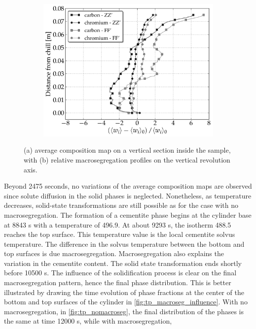 \begin{figure}[htbp]
\begin{subfigure}[t]{0.55\textwidth}
	\includegraphics[width=1.0\textwidth]{Chapter3/Graphics/multicomponent/interior/final_segregation_ZZ_FF.pdf}
	\caption{}
    \label{fig:final_segregation_ZZ_FF}
  \end{subfigure}
\caption{(a) average composition map on a vertical section inside the sample, with
 (b) relative macrosegregation profiles on the vertical revolution axis.} 
\label{fig:final_ZZ_FF}
\end{figure}
%
Beyond \num{2475} seconds, no variations of the average composition maps are observed since solute diffusion 
in the solid phases is neglected. Nonetheless, as temperature decreases, solid-state transformations are 
still possible as for the case with no macrosegregation. The formation of a cementite phase begins at the 
cylinder base at \num{8843} s with a temperature of \SI{496.9}{\udegC}. At about \num{9293} s, the isotherm \SI{488.5}{\udegC} reaches the 
top surface. This temperature value is the local cementite solvus temperature. The difference in the solvus 
temperature between the bottom and top surfaces is due macrosegregation. Macrosegregation also explains the 
variation in the cementite content. The solid state transformation ends shortly before \num{10500} s. The influence of the solidification process is clear on 
the final macrosegregation pattern, hence the final phase distribution. This is better illustrated by drawing the time evolution of phase fractions at the 
center of the bottom and top surfaces of the cylinder in \cref{fig:tp_macroseg_influence}. With no macrosegregation, in 
\cref{fig:tp_nomacroseg}, the final distribution of the phases is the same at time \num{12000} s, while with macrosegregation, 
